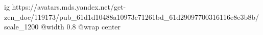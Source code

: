  
 
 
 
 

\ifcmt
  ig https://avatars.mds.yandex.net/get-zen_doc/119173/pub_61d1d10488a10973c71261bd_61d29097700316116e8e3b8b/scale_1200
  @width 0.8
	@wrap center
\fi
